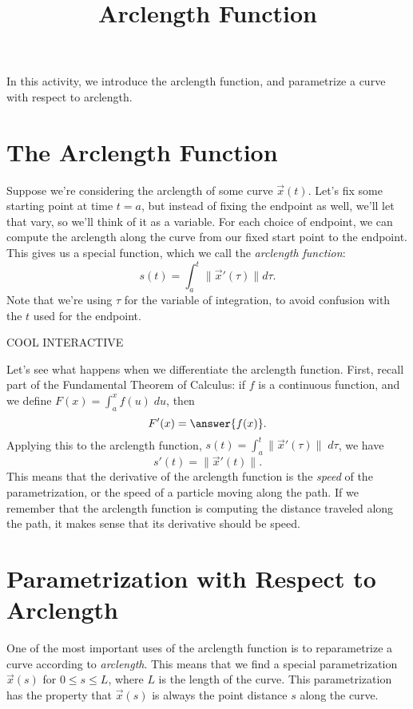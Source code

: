 \documentclass{ximera}
\title{Arclength Function}
\begin{document}
\begin{abstract}
\end{abstract}
\maketitle

In this activity, we introduce the arclength function, and parametrize a curve with respect to arclength.

\section*{The Arclength Function}

Suppose we're considering the arclength of some curve $\vec{x}(t)$. Let's fix some starting point at time $t=a$, but instead of fixing the endpoint as well, we'll let that vary, so we'll think of it as a variable. For each choice of endpoint, we can compute the arclength along the curve from our fixed start point to the endpoint. This gives us a special function, which we call the \emph{arclength function}:
\[
s(t) = \int_a^t \|\vec{x}'(\tau)\|d\tau.
\]
Note that we're using $\tau$ for the variable of integration, to avoid confusion with the $t$ used for the endpoint.

COOL INTERACTIVE

Let's see what happens when we differentiate the arclength function. First, recall part of the Fundamental Theorem of Calculus: if $f$ is a continuous function, and we define $F(x) = \int_a^x f(u)\;du$, then
\[
F'(x) = \answer{f(x)}.
\]
Applying this to the arclength function, $s(t) = \int_a^t \|\vec{x}'(\tau)\|\;d\tau$, we have
\[
s'(t) = \|\vec{x}'(t)\|.
\]
This means that the derivative of the arclength function is the \emph{speed} of the parametrization, or the speed of a particle moving along the path. If we remember that the arclength function is computing the distance traveled along the path, it makes sense that its derivative should be speed.


\section*{Parametrization with Respect to Arclength}

One of the most important uses of the arclength function is to reparametrize a curve according to \emph{arclength}. This means that we find a special parametrization $\vec{x}(s)$ for $0\leq s\leq L$, where $L$ is the length of the curve. This parametrization has the property that $\vec{x}(s)$ is always the point distance $s$ along the curve.
\end{document}
